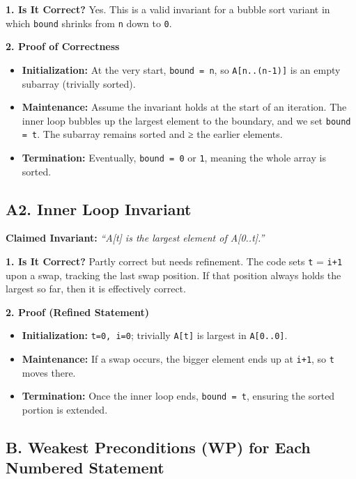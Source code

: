 \documentclass[12pt]{article}
\begin{document}
    \textbf{1. Is It Correct?}
    Yes. This is a valid invariant for a bubble sort variant in which \texttt{bound} shrinks from \texttt{n} down to \texttt{0}.

    \textbf{2. Proof of Correctness}

    \begin{itemize}
        \item \textbf{Initialization:} At the very start, \texttt{bound = n}, so \texttt{A[n..(n-1)]} is an empty subarray (trivially sorted).
        \item \textbf{Maintenance:} Assume the invariant holds at the start of an iteration. The inner loop bubbles up the largest element to the boundary, and we set \texttt{bound = t}. The subarray remains sorted and ≥ the earlier elements.
        \item \textbf{Termination:} Eventually, \texttt{bound = 0} or \texttt{1}, meaning the whole array is sorted.
    \end{itemize}

    \subsection*{A2. Inner Loop Invariant}

    \textbf{Claimed Invariant:}
    \emph{``A[t] is the largest element of A[0..t].''}

    \textbf{1. Is It Correct?}
    Partly correct but needs refinement. The code sets \texttt{t} = \texttt{i+1} upon a swap, tracking the last swap position. If that position always holds the largest so far, then it is effectively correct.

    \textbf{2. Proof (Refined Statement)}

    \begin{itemize}
        \item \textbf{Initialization:} \texttt{t=0, i=0}; trivially \texttt{A[t]} is largest in \texttt{A[0..0]}.
        \item \textbf{Maintenance:} If a swap occurs, the bigger element ends up at \texttt{i+1}, so \texttt{t} moves there.
        \item \textbf{Termination:} Once the inner loop ends, \texttt{bound = t}, ensuring the sorted portion is extended.
    \end{itemize}

    \subsection*{B. Weakest Preconditions (WP) for Each Numbered Statement}
\end{document}
